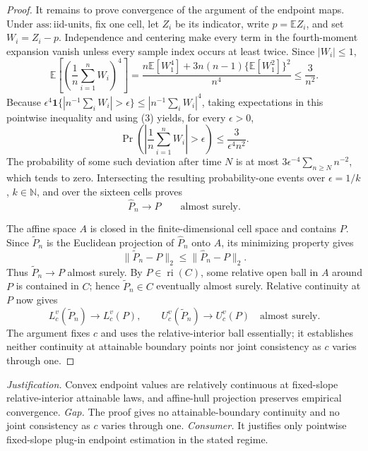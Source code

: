 \documentclass{article}
\begin{document}
\begin{proof}
It remains to prove convergence of the argument of the endpoint maps.  Under \(\mathrm{ass{:}iid\text{-}units}\), fix one cell, let \(Z_i\) be its indicator, write \(p=\mathbb E Z_i\), and set \(W_i=Z_i-p\).  Independence and centering make every term in the fourth-moment expansion vanish unless every sample index occurs at least twice.  Since \(|W_i|\le1\),
\[
 \mathbb E\!\left[\left(\frac1n\sum_{i=1}^nW_i\right)^4\right]
 =\frac{n\mathbb E[W_1^4]+3n(n-1)\{\mathbb E[W_1^2]\}^2}{n^4}
 \le\frac3{n^2}. \tag{3}
\]
Because \(\epsilon^4\mathbf 1\{|n^{-1}\sum_iW_i|>\epsilon\}\le|n^{-1}\sum_iW_i|^4\), taking expectations in this pointwise inequality and using (3) yields, for every \(\epsilon>0\),
\[
 \Pr\!\left(\left|\frac1n\sum_{i=1}^nW_i\right|>\epsilon\right)
 \le\frac3{\epsilon^4n^2}. \tag{4}
\]
The probability of some such deviation after time \(N\) is at most \(3\epsilon^{-4}\sum_{n\ge N}n^{-2}\), which tends to zero.  Intersecting the resulting probability-one events over \(\epsilon=1/k\), \(k\in\mathbb N\), and over the sixteen cells proves
\[
 \widehat P_n\longrightarrow P\qquad\text{almost surely}. \tag{5}
\]

The affine space \(A\) is closed in the finite-dimensional cell space and contains \(P\).  Since \(\widetilde P_n\) is the Euclidean projection of \(\widehat P_n\) onto \(A\), its minimizing property gives
\[
 \|\widetilde P_n-P\|_2\le\|\widehat P_n-P\|_2. \tag{6}
\]
Thus \(\widetilde P_n\to P\) almost surely.  By \(P\in\operatorname{ri}(C)\), some relative open ball in \(A\) around \(P\) is contained in \(C\); hence \(\widetilde P_n\in C\) eventually almost surely.  Relative continuity at \(P\) now gives
\[
 L_c^v(\widetilde P_n)\longrightarrow L_c^v(P),
 \qquad
 U_c^v(\widetilde P_n)\longrightarrow U_c^v(P)
 \quad\text{almost surely}. \tag{7}
\]
The argument fixes \(c\) and uses the relative-interior ball essentially; it establishes neither continuity at attainable boundary points nor joint consistency as \(c\) varies through one.
\end{proof}
\par\smallskip\noindent \textit{Justification.} Convex endpoint values are relatively continuous at fixed-slope relative-interior attainable laws, and affine-hull projection preserves empirical convergence. \textit{Gap.} The proof gives no attainable-boundary continuity and no joint consistency as \(c\) varies through one. \textit{Consumer.} It justifies only pointwise fixed-slope plug-in endpoint estimation in the stated regime.
\end{document}
